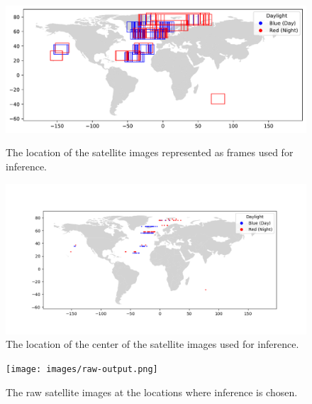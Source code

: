 \documentclass[sigplan,screen]{acmart}
\begin{document}
\begin{figure}[htb]
\centering\includegraphics[width=0.75\paperwidth]{images/inference-frames.pdf}
\caption{The location of the satellite images represented as frames used for inference.}
\label{fig:frames-inference}

\centering\includegraphics[width=0.8\paperwidth]{images/inference-dots.png}
\caption{The location of the center of the satellite images used for inference.}
\label{fig:frames-dot}
\end{figure}

\begin{figure}[htb]
\centering\texttt{[image: images/raw-output.png]}
\caption{The raw satellite images at the locations where inference is chosen.}
\label{fig:frames-raw}
\end{figure}
\end{document}
